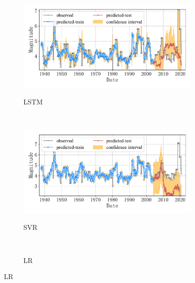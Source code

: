 \begin{figure}[!htbp]
  \vspace{-2cm}
  \centering
  \begin{subfigure}[b]{0.45\textwidth}
    \caption{LSTM}
    \includegraphics[width=\textwidth]{Img/chap5_seism/block1/seism_lstm_minyear_1932_maxyear_2021_spanlat_2_spanlon_4_timewindow_72_nextmonth_12_minmag_3.0_block_1.pdf}
    \vspace{-1cm}
    \label{fig:seism_lstm_minyear_1932_maxyear_2021_spanlat_2_spanlon_4_timewindow_72_nextmonth_12_minmag_3.0_block_1}
  \end{subfigure}
  ~
  \begin{subfigure}[b]{0.45\textwidth}
    \caption{SVR} 
    \includegraphics[width=\textwidth]{Img/chap5_seism/block1/seism_svr_minyear_1932_maxyear_2021_spanlat_2_spanlon_4_timewindow_72_nextmonth_12_minmag_3.0_block_1.pdf}
    \vspace{-1cm}
    \label{fig:seism_svr_minyear_1932_maxyear_2021_spanlat_2_spanlon_4_timewindow_72_nextmonth_12_minmag_3.0_block_1}
  \end{subfigure}   
  \\
  \begin{subfigure}[b]{0.45\textwidth}
      \caption{LR}
      \vspace{-0.2cm}

\end{subfigure}
\end{figure}

